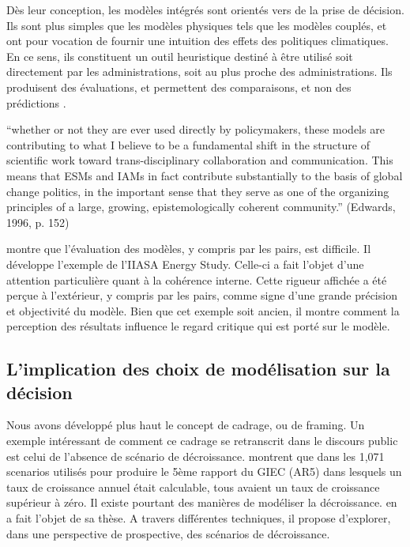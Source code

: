 
Dès leur conception, les modèles intégrés sont orientés vers de la prise de décision. Ils sont plus simples que les modèles physiques tels que les modèles couplés, et ont pour vocation de fournir une intuition des effets des politiques climatiques. En ce sens, ils constituent un outil heuristique destiné à être utilisé soit directement par les administrations, soit au plus proche des administrations. Ils produisent des évaluations, et permettent des comparaisons, et non des prédictions \cite{edwards_global_1996}. 

\begin{displayquote}
“whether or not they are ever used directly by policymakers, these models are contributing to what I believe to be a fundamental shift in the structure of scientific work toward trans-disciplinary collaboration and communication. This means that ESMs and IAMs in fact contribute substantially to the basis of global change politics, in the important sense that they serve as one of the organizing principles of a large, growing, epistemologically coherent community.” (Edwards, 1996, p. 152)
\end{displayquote}


\cite{wynne_institutional_1984} montre que l'évaluation des modèles, y compris par les pairs, est difficile. Il développe l'exemple de l'IIASA Energy Study. Celle-ci a fait l'objet d'une attention particulière quant à la cohérence interne. Cette rigueur affichée a été perçue à l'extérieur, y compris par les pairs, comme signe d'une grande précision et objectivité du modèle.  Bien que cet exemple soit ancien, il montre comment la perception des résultats influence le regard critique qui est porté sur le modèle. 

\subsection{L'implication des choix de modélisation sur la décision}

Nous avons développé plus haut le concept de cadrage, ou de framing. Un exemple intéressant de comment ce cadrage se retranscrit dans le discours public est celui de l'absence de scénario de décroissance. \cite{cointe_understanding_2023} montrent que dans les 1,071 scenarios utilisés pour produire le 5ème rapport du GIEC (AR5) dans lesquels un taux de croissance annuel était calculable, tous avaient un taux de croissance supérieur à zéro. 
Il existe pourtant des manières de modéliser la décroissance. \cite{briens_decroissance_2015} en a fait l'objet de sa thèse. A travers différentes techniques, il propose d'explorer, dans une perspective de prospective, des scénarios de décroissance. 

